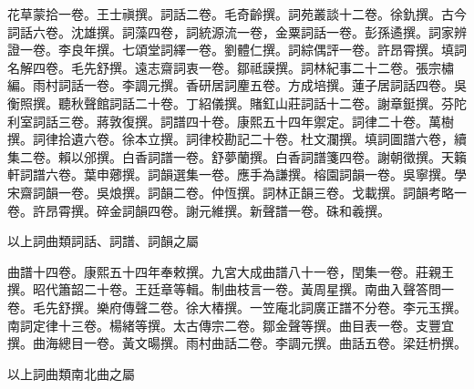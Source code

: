 \begin{pinyinscope}
花草蒙拾一卷。王士禛撰。詞話二卷。毛奇齡撰。詞苑叢談十二卷。徐釚撰。古今詞話六卷。沈雄撰。詞藻四卷，詞統源流一卷，金粟詞話一卷。彭孫遹撰。詞家辨證一卷。李良年撰。七頌堂詞繹一卷。劉體仁撰。詞綜偶評一卷。許昂霄撰。填詞名解四卷。毛先舒撰。遠志齋詞衷一卷。鄒祗謨撰。詞林紀事二十二卷。張宗橚編。雨村詞話一卷。李調元撰。香研居詞麈五卷。方成培撰。蓮子居詞話四卷。吳衡照撰。聽秋聲館詞話二十卷。丁紹儀撰。賭釭山莊詞話十二卷。謝章鋌撰。芬陀利室詞話三卷。蔣敦復撰。詞譜四十卷。康熙五十四年禦定。詞律二十卷。萬樹撰。詞律拾遺六卷。徐本立撰。詞律校勘記二十卷。杜文瀾撰。填詞圖譜六卷，續集二卷。賴以邠撰。白香詞譜一卷。舒夢蘭撰。白香詞譜箋四卷。謝朝徵撰。天籟軒詞譜六卷。葉申薌撰。詞韻選集一卷。應手為謙撰。榕園詞韻一卷。吳寧撰。學宋齋詞韻一卷。吳烺撰。詞韻二卷。仲恆撰。詞林正韻三卷。戈載撰。詞韻考略一卷。許昂霄撰。碎金詞韻四卷。謝元維撰。新聲譜一卷。硃和羲撰。

以上詞曲類詞話、詞譜、詞韻之屬

曲譜十四卷。康熙五十四年奉敕撰。九宮大成曲譜八十一卷，閏集一卷。莊親王撰。昭代簫韶二十卷。王廷章等輯。制曲枝言一卷。黃周星撰。南曲入聲答問一卷。毛先舒撰。樂府傳聲二卷。徐大椿撰。一笠庵北詞廣正譜不分卷。李元玉撰。南詞定律十三卷。楊緒等撰。太古傳宗二卷。鄒金聲等撰。曲目表一卷。支豐宜撰。曲海總目一卷。黃文暘撰。雨村曲話二卷。李調元撰。曲話五卷。梁廷枬撰。

以上詞曲類南北曲之屬


\end{pinyinscope}